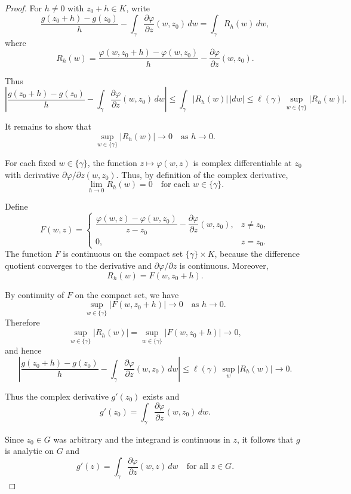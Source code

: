 \documentclass[12pt, a4paper]{report}
\theoremstyle{spaced}
\begin{document}
\begin{proof}
	For $h\neq 0$ with $z_0+h\in K$, write
	\[
		\frac{g(z_0+h)-g(z_0)}{h}
		- \int_{\gamma} \frac{\partial\varphi}{\partial z}(w,z_0)\,dw
		= \int_{\gamma} R_h(w)\,dw,
	\]
	where
	\[
		R_h(w)
		= \frac{\varphi(w,z_0+h)-\varphi(w,z_0)}{h}
		- \frac{\partial\varphi}{\partial z}(w,z_0).
	\]

	Thus
	\[
		\left|
		\frac{g(z_0+h)-g(z_0)}{h}
		- \int_{\gamma} \frac{\partial\varphi}{\partial z}(w,z_0)\,dw
		\right|
		\le \int_{\gamma} |R_h(w)|\,|dw|
		\le \ell(\gamma)\,\sup_{w\in\{\gamma\}} |R_h(w)|.
	\]

	It remains to show that
	\[
		\sup_{w\in\{\gamma\}} |R_h(w)| \longrightarrow 0
		\quad\text{as } h\to 0.
	\]

	For each fixed $w\in\{\gamma\}$, the function $z\mapsto \varphi(w,z)$
	is complex differentiable at $z_0$ with derivative
	$\partial\varphi/\partial z(w,z_0)$.
	Thus, by definition of the complex derivative,
	\[
		\lim_{h\to 0} R_h(w)=0
		\quad\text{for each } w\in\{\gamma\}.
	\]

	Define
	\[
		F(w,z)
		= \begin{cases}
			\dfrac{\varphi(w,z)-\varphi(w,z_0)}{z-z_0}
			- \dfrac{\partial\varphi}{\partial z}(w,z_0),
			   & z\ne z_0, \\[6pt]
			0, & z=z_0.
		\end{cases}
	\]
	The function $F$ is continuous on the compact set $\{\gamma\}\times K$,
	because the difference quotient converges to the derivative and
	$\partial\varphi/\partial z$ is continuous.
	Moreover,
	\[
		R_h(w) = F(w,z_0+h).
	\]

	By continuity of $F$ on the compact set, we have
	\[
		\sup_{w\in\{\gamma\}} |F(w,z_0+h)|
		\longrightarrow 0
		\quad\text{as } h\to 0.
	\]
	Therefore
	\[
		\sup_{w\in\{\gamma\}} |R_h(w)|
		=
		\sup_{w\in\{\gamma\}} |F(w,z_0+h)|
		\longrightarrow 0,
	\]
	and hence
	\[
		\left|
		\frac{g(z_0+h)-g(z_0)}{h}
		- \int_{\gamma} \frac{\partial\varphi}{\partial z}(w,z_0)\,dw
		\right|
		\le \ell(\gamma)\,\sup_{w} |R_h(w)|
		\longrightarrow 0.
	\]

	Thus the complex derivative $g'(z_0)$ exists and
	\[
		g'(z_0)=\int_{\gamma} \frac{\partial\varphi}{\partial z}(w,z_0)\,dw.
	\]

	Since $z_0\in G$ was arbitrary and the integrand is continuous in $z$,
	it follows that $g$ is analytic on $G$ and
	\[
		g'(z)=\int_{\gamma} \frac{\partial\varphi}{\partial z}(w,z)\,dw
		\quad\text{for all } z\in G.
	\]
\end{proof}
\end{document}
